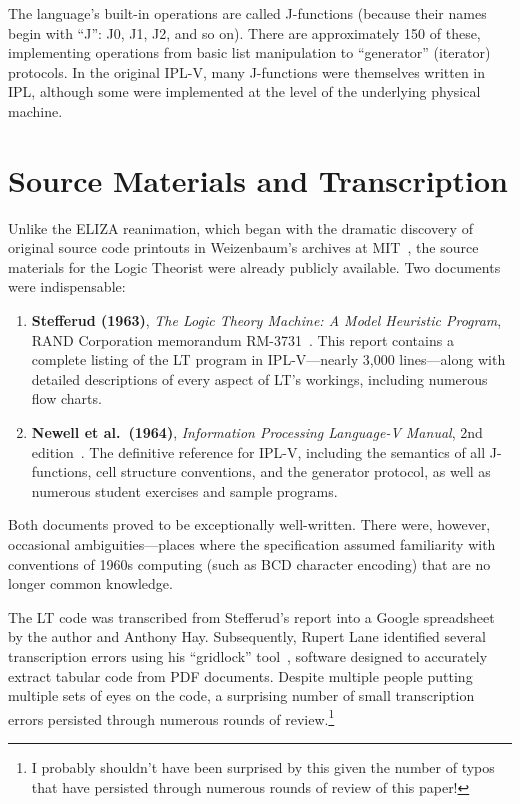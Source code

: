 \documentclass[journal]{IEEEtran}
\begin{document}
The language's built-in operations are called J-functions (because
their names begin with ``J'': J0, J1, J2, and so on). There are
approximately 150 of these, implementing operations from basic list
manipulation to ``generator'' (iterator) protocols. In the original
IPL-V, many J-functions were themselves written in IPL, although some
were implemented at the level of the underlying physical machine.

\section{Source Materials and Transcription}
\label{sec:sources}

Unlike the ELIZA reanimation, which began with the dramatic discovery
of original source code printouts in Weizenbaum's archives at
MIT~\cite{lane2025eliza}, the source materials for the Logic Theorist
were already publicly available. Two documents were indispensable:

\begin{enumerate}
\item \textbf{Stefferud (1963)}, \textit{The Logic Theory Machine: A
  Model Heuristic Program}, RAND Corporation memorandum
  RM-3731~\cite{stefferud1963lt}. This report contains a complete
  listing of the LT program in IPL-V---nearly 3,000 lines---along with
  detailed descriptions of every aspect of LT's workings, including
  numerous flow charts.

\item \textbf{Newell et al.\ (1964)}, \textit{Information Processing
  Language-V Manual}, 2nd edition~\cite{newell1964ipl}. The definitive
  reference for IPL-V, including the semantics of all J-functions,
  cell structure conventions, and the generator protocol, as well as
  numerous student exercises and sample programs.
\end{enumerate}

Both documents proved to be exceptionally well-written. There were,
however, occasional ambiguities---places where the specification
assumed familiarity with conventions of 1960s computing (such as BCD
character encoding) that are no longer common knowledge.

The LT code was transcribed from Stefferud's report into a Google
spreadsheet by the author and Anthony Hay. Subsequently, Rupert Lane
identified several transcription errors using his ``gridlock''
tool~\cite{lane2024gridlock}, software designed to accurately extract
tabular code from PDF documents. Despite multiple people putting
multiple sets of eyes on the code, a surprising number of small
transcription errors persisted through numerous rounds of
review.\footnote{I probably shouldn't have been surprised by this
given the number of typos that have persisted through numerous rounds
of review of this paper!}
\end{document}
